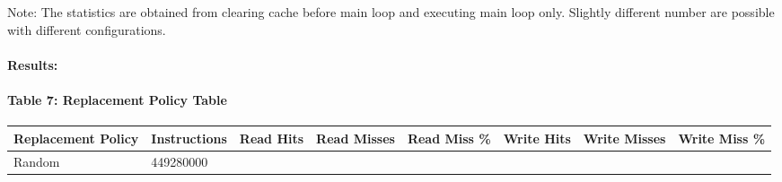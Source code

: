 \documentclass[11pt]{article}
\begin{document}
Note: The statistics are obtained from clearing cache before main loop
and executing main loop only. Slightly different number are possible
with different configurations.

\paragraph{Results:}\label{results}

\paragraph{Table 7: Replacement Policy
Table}\label{table-7-replacement-policy-table}

\begin{longtable}[]{@{}llllllll@{}}
\toprule
\begin{minipage}[b]{0.14\columnwidth}\raggedright\strut
Replacement Policy\strut
\end{minipage} & \begin{minipage}[b]{0.10\columnwidth}\raggedright\strut
Instructions\strut
\end{minipage} & \begin{minipage}[b]{0.08\columnwidth}\raggedright\strut
Read Hits\strut
\end{minipage} & \begin{minipage}[b]{0.09\columnwidth}\raggedright\strut
Read Misses\strut
\end{minipage} & \begin{minipage}[b]{0.09\columnwidth}\raggedright\strut
Read Miss \%\strut
\end{minipage} & \begin{minipage}[b]{0.09\columnwidth}\raggedright\strut
Write Hits\strut
\end{minipage} & \begin{minipage}[b]{0.10\columnwidth}\raggedright\strut
Write Misses\strut
\end{minipage} & \begin{minipage}[b]{0.10\columnwidth}\raggedright\strut
Write Miss \%\strut
\end{minipage}\tabularnewline
\midrule
\endhead
\begin{minipage}[t]{0.14\columnwidth}\raggedright\strut
Random\strut
\end{minipage} & \begin{minipage}[t]{0.10\columnwidth}\raggedright\strut
449280000\strut
\end{minipage} & \begin{minipage}[t]{0.08\columnwidth}\raggedright\strut

\end{minipage}
\end{longtable}
\end{document}

